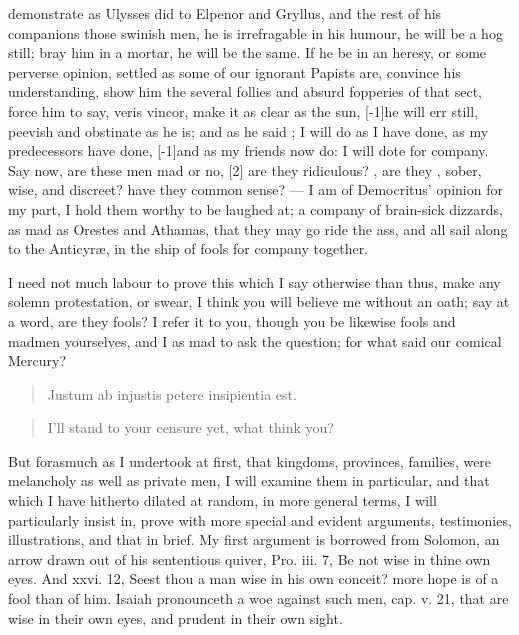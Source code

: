 {demonstrate as Ulysses did to Elpenor and Gryllus, and the rest of
his companions those swinish men, he is irrefragable in his humour, he
will be a hog still; bray him in a mortar, he will be the same. If he
be in an heresy, or some perverse opinion, settled as some of our
ignorant Papists are, convince his understanding, show him the several
follies and absurd fopperies of that sect, force him to say, veris
vincor, make it as clear as the sun, [-1\baselineskip]he will err still, peevish
and obstinate as he is; and as he said ; I will do as I have done, as
my predecessors have done, [-1\baselineskip]and as my friends now do: I will dote
for company. Say now, are these men mad or no, [2\baselineskip] are they ridiculous? , are they , sober, wise, and discreet? have they common sense? --- I am of Democritus' opinion for my part, I hold
them worthy to be laughed at; a company of brain-sick dizzards, as mad
as Orestes and Athamas, that they may go ride the ass, and all
sail along to the Anticyr\ae{}, in the ship of fools for company together.

I need not much labour to prove this which I say otherwise than thus,
make any solemn protestation, or swear, I think you will believe me
without an oath; say at a word, are they fools? I refer it to you,
though you be likewise fools and madmen yourselves, and I as mad to ask
the question; for what said our comical Mercury?

\begin{verse}
\textlatin{Justum ab injustis petere insipientia est.}
\end{verse}

\begin{verse}
I'll stand to your censure yet, what think you?
\end{verse}

But forasmuch as I undertook at first, that kingdoms, provinces,
families, were melancholy as well as private men, I will examine them
in particular, and that which I have hitherto dilated at random, in
more general terms, I will particularly insist in, prove with more
special and evident arguments, testimonies, illustrations, and that in
brief.  My first
argument is borrowed from Solomon, an arrow drawn out of his
sententious quiver, Pro. iii. 7, Be not wise in thine own eyes. And
xxvi. 12, Seest thou a man wise in his own conceit? more hope is of a
fool than of him. Isaiah pronounceth a woe against such men, cap. v.
21, that are wise in their own eyes, and prudent in their own sight.

}
